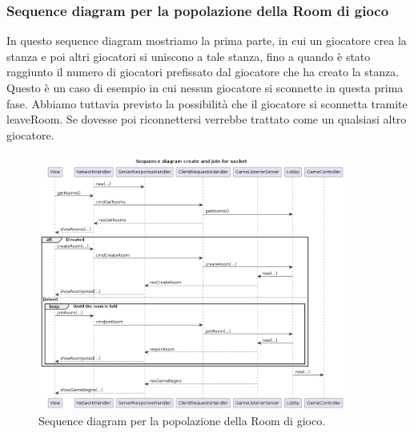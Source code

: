 \documentclass[12pt]{article}
\begin{document}
\subsubsection{Sequence diagram per la popolazione della Room di gioco}
In questo sequence diagram mostriamo la prima parte, in cui un giocatore crea la stanza e poi altri giocatori si uniscono a tale stanza, fino a quando è stato raggiunto il numero di giocatori prefissato dal giocatore che ha creato la stanza.
\\
Questo è un caso di esempio in cui nessun giocatore si sconnette in questa prima fase. Abbiamo tuttavia previsto la possibilità che il giocatore si sconnetta tramite leaveRoom. Se dovesse poi riconnettersi verrebbe trattato come un qualsiasi altro giocatore.
\begin{figure}[H]
  \centering
  \includegraphics[width=0.9\textwidth]{img/sequenceRoomsDetailed.png}
  \caption{Sequence diagram per la popolazione della Room di gioco.}
  \label{fig:sequenceRooms}
\end{figure}
\end{document}
